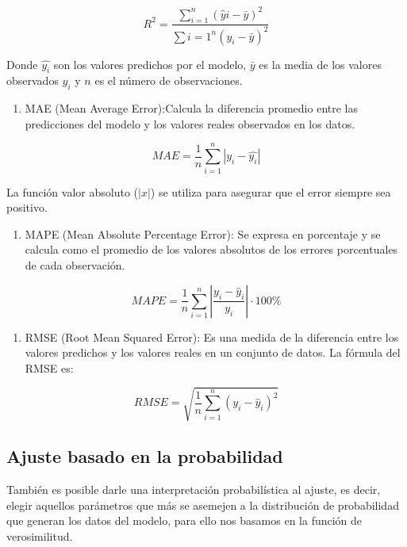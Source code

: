 \documentclass[
]{book}
\providecommand{\tightlist}{%
  \setlength{\itemsep}{0pt}\setlength{\parskip}{0pt}}
\begin{document}
\[ R^2 = \frac{\sum_{i=1}^n (\hat{y}i - \bar{y})^2}{\sum{i=1}^n (y_i - \bar{y})^2} \]

Donde \(\hat{y_i}\) son los valores predichos por el modelo, \(\bar{y}\) es
la media de los valores observados \(y_i\) y \(n\) es el número de
observaciones.

\begin{enumerate}
\def\labelenumi{\arabic{enumi}.}
\setcounter{enumi}{1}
\tightlist
\item
  MAE (Mean Average Error):Calcula la diferencia promedio entre las
  predicciones del modelo y los valores reales observados en los
  datos.
\end{enumerate}

\[MAE = \frac{1}{n}\sum_{i=1}^{n}|y_i - \hat{y_i}|\]

La función valor absoluto (\(|x|\)) se utiliza para asegurar que el error
siempre sea positivo.

\begin{enumerate}
\def\labelenumi{\arabic{enumi}.}
\setcounter{enumi}{2}
\tightlist
\item
  MAPE (Mean Absolute Percentage Error): Se expresa en porcentaje y se
  calcula como el promedio de los valores absolutos de los errores
  porcentuales de cada observación.
\end{enumerate}

\[MAPE = \frac{1}{n} \sum_{i=1}^{n} \left|\frac{y_i - \hat{y}_i}{y_i}\right|\cdot 100\%\]

\begin{enumerate}
\def\labelenumi{\arabic{enumi}.}
\setcounter{enumi}{3}
\tightlist
\item
  RMSE (Root Mean Squared Error): Es una medida de la diferencia entre
  los valores predichos y los valores reales en un conjunto de datos.
  La fórmula del RMSE es:
\end{enumerate}

\[ RMSE = \sqrt{\frac{1}{n}\sum_{i=1}^n(y_i - \hat{y}_i)^2} \]

\subsection{Ajuste basado en la probabilidad}\label{ajuste-basado-en-la-probabilidad}

También es posible darle una interpretación probabilística al ajuste, es
decir, elegir aquellos parámetros que más se asemejen a la distribución
de probabilidad que generan los datos del modelo, para ello nos basamos
en la función de verosimilitud.
\end{document}
